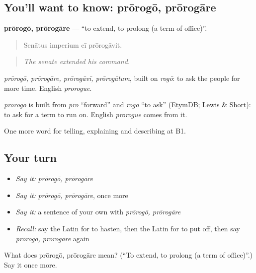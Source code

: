 \subsection*{You'll want to know: prōrogō, prōrogāre}
\textbf{prōrogō, prōrogāre} — \textquotedblleft{}to extend, to prolong (a term of office)\textquotedblright{}.

\begin{quote}
Senātus imperium eī prōrogāvit.
\end{quote}

\begin{quote}
\emph{The senate extended his command.}
\end{quote}

\emph{prōrogō, prōrogāre, prōrogāvī, prōrogātum}, built on \emph{rogō}: to ask the people for more time. English \emph{prorogue}.

\begin{cousinweb}
\emph{prōrogō} is built from \emph{prō} \textquotedblleft{}forward\textquotedblright{} and \emph{rogō} \textquotedblleft{}to ask\textquotedblright{} (EtymDB; Lewis \& Short): to ask for a term to run on. English \emph{prorogue} comes from it.
\end{cousinweb}

\begin{grammarlens}[title={What you've built}]
One more word for telling, explaining and describing at B1.
\end{grammarlens}

\subsection*{Your turn}
\begin{itemize}
\raggedright
  \item \emph{Say it:} \emph{prōrogō, prōrogāre}
  \item \emph{Say it:} \emph{prōrogō, prōrogāre}, once more
  \item \emph{Say it:} a sentence of your own with \emph{prōrogō, prōrogāre}
  \item \emph{Recall:} say the Latin for to hasten, then the Latin for to put off, then say \emph{prōrogō, prōrogāre} again
\end{itemize}

\begin{tcolorbox}[breakable,colback=teal!4,colframe=teal!35!black,title={Before you move on}]
What does prōrogō, prōrogāre mean? (\textquotedblleft{}To extend, to prolong (a term of office)\textquotedblright{}.) Say it once more.
\end{tcolorbox}
